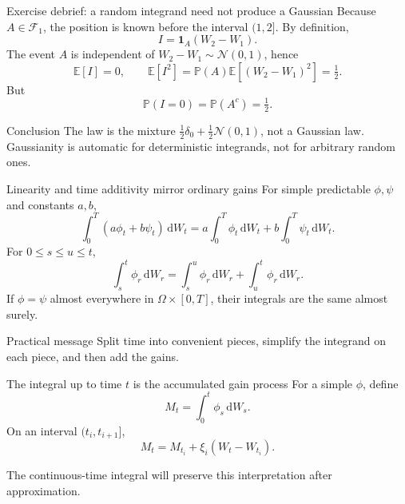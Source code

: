 \documentclass[handout,10pt,aspectratio=169]{beamer}
\newcommand{\E}{\mathbb E}
\newcommand{\Pp}{\mathbb P}
\newcommand{\F}{\mathcal F}
\newcommand{\dd}{\,\mathrm d}
\begin{document}
\begin{frame}{Exercise debrief: a random integrand need not produce a Gaussian}
Because \(A\in\F_1\), the position is known before the interval \((1,2]\). By definition,
\[
I=\mathbf 1_A(W_2-W_1).
\]
The event \(A\) is independent of \(W_2-W_1\sim\mathcal N(0,1)\), hence
\[
\E[I]=0,
\qquad
\E[I^2]=\Pp(A)\E[(W_2-W_1)^2]=\tfrac12.
\]
But
\[
\Pp(I=0)=\Pp(A^c)=\tfrac12.
\]
\begin{block}{Conclusion}
The law is the mixture \(\frac12\delta_0+\frac12\mathcal N(0,1)\), not a Gaussian law. Gaussianity is automatic for deterministic integrands, not for arbitrary random ones.
\end{block}
\end{frame}

\begin{frame}{Linearity and time additivity mirror ordinary gains}
For simple predictable \(\phi,\psi\) and constants \(a,b\),
\[
\int_0^T(a\phi_t+b\psi_t)\dd W_t
=a\int_0^T\phi_t\dd W_t
+b\int_0^T\psi_t\dd W_t.
\]
For \(0\le s\le u\le t\),
\[
\int_s^t\phi_r\dd W_r
=\int_s^u\phi_r\dd W_r
+\int_u^t\phi_r\dd W_r.
\]
If \(\phi=\psi\) almost everywhere in \(\Omega\times[0,T]\), their integrals are the same almost surely.
\begin{block}{Practical message}
Split time into convenient pieces, simplify the integrand on each piece, and then add the gains.
\end{block}
\end{frame}

\begin{frame}{The integral up to time \(t\) is the accumulated gain process}
For a simple \(\phi\), define
\[
M_t=\int_0^t\phi_s\dd W_s.
\]
On an interval \((t_i,t_{i+1}]\),
\[
M_t=M_{t_i}+\xi_i(W_t-W_{t_i}).
\]
\begin{center}
\end{center}
The continuous-time integral will preserve this interpretation after approximation.
\end{frame}

\end{document}
